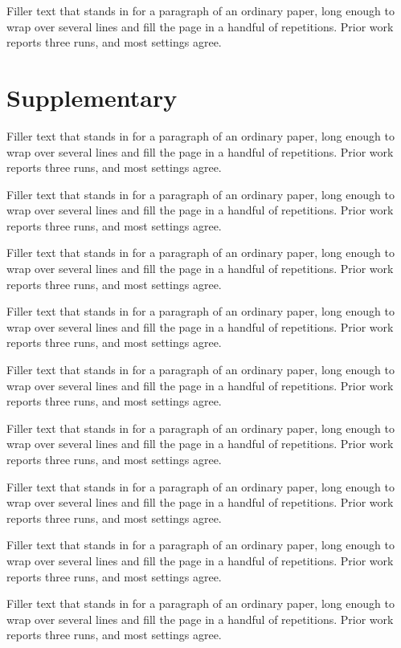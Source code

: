 \documentclass{article}
\begin{document}
Filler text that stands in for a paragraph of an ordinary paper, long enough to wrap over several lines and fill the page in a handful of repetitions. Prior work reports three runs, and most settings agree.\par
\clearpage\setcounter{page}{1}\section*{Supplementary}
Filler text that stands in for a paragraph of an ordinary paper, long enough to wrap over several lines and fill the page in a handful of repetitions. Prior work reports three runs, and most settings agree.\par
Filler text that stands in for a paragraph of an ordinary paper, long enough to wrap over several lines and fill the page in a handful of repetitions. Prior work reports three runs, and most settings agree.\par
Filler text that stands in for a paragraph of an ordinary paper, long enough to wrap over several lines and fill the page in a handful of repetitions. Prior work reports three runs, and most settings agree.\par
Filler text that stands in for a paragraph of an ordinary paper, long enough to wrap over several lines and fill the page in a handful of repetitions. Prior work reports three runs, and most settings agree.\par
Filler text that stands in for a paragraph of an ordinary paper, long enough to wrap over several lines and fill the page in a handful of repetitions. Prior work reports three runs, and most settings agree.\par
Filler text that stands in for a paragraph of an ordinary paper, long enough to wrap over several lines and fill the page in a handful of repetitions. Prior work reports three runs, and most settings agree.\par
Filler text that stands in for a paragraph of an ordinary paper, long enough to wrap over several lines and fill the page in a handful of repetitions. Prior work reports three runs, and most settings agree.\par
Filler text that stands in for a paragraph of an ordinary paper, long enough to wrap over several lines and fill the page in a handful of repetitions. Prior work reports three runs, and most settings agree.\par
Filler text that stands in for a paragraph of an ordinary paper, long enough to wrap over several lines and fill the page in a handful of repetitions. Prior work reports three runs, and most settings agree.\par
\end{document}
